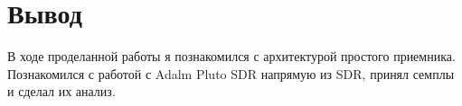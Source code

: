 \chapter{Вывод}
\label{ch:chap3}

В ходе проделанной работы я познакомился с архитектурой простого приемника. Познакомился с работой с Adalm Pluto SDR напрямую из 
SDR, принял семплы и сделал их анализ.

\endinput